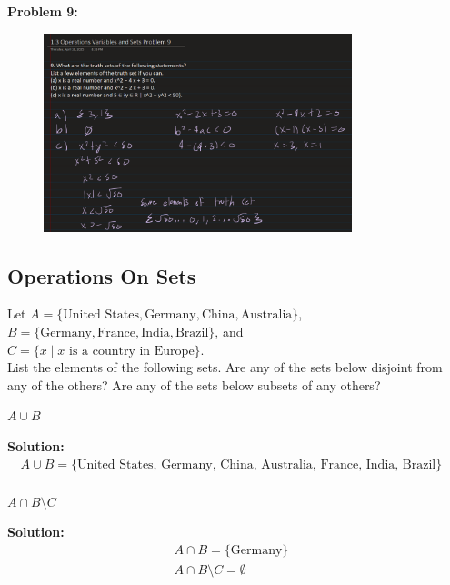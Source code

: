 \textbf{Problem 9:}
\begin{figure}[H]
    \centering
    \includegraphics[width=0.8\textwidth]{images/1.2/25.PNG}
\end{figure}

\subsection{Operations On Sets}

\begin{tcolorbox}[title=Problem 2, breakable]
Let $A = \{\text{United States}, \text{Germany}, \text{China}, \text{Australia}\}$,\\
$B = \{\text{Germany}, \text{France}, \text{India}, \text{Brazil}\}$, and\\
$C = \{x \mid x \text{ is a country in Europe}\}$.\\

List the elements of the following sets. Are any of the sets below disjoint from any 
of the others? Are any of the sets below subsets of any others?
\end{tcolorbox}

\begin{tcolorbox}[title=Problem 2 (a), breakable]
$A \cup B$ 
\end{tcolorbox}

\textbf{Solution:}
\begin{align*}
A \cup B = \text{\{United States, Germany, China, Australia, France, India, Brazil\}} & \\
\end{align*}

\begin{tcolorbox}[title=Problem 2 (b), breakable]
$A \cap B \setminus C$
\end{tcolorbox}

\textbf{Solution:}
\begin{align*}
A \cap B = \text{\{Germany\}} & \\
A \cap B \setminus C = \emptyset  & \\
\end{align*}

